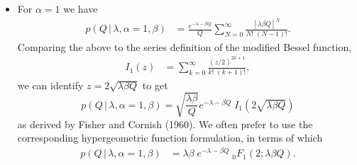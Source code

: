 \documentclass[11pt]{article}
\newcommand{\cond}{\,|\,}
\begin{document}
\begin{itemize}
\item For $\alpha=1$ we have
  \begin{align}
    p(Q\cond \lambda,\alpha{=}1,\beta)
    &= \frac{e^{-\lambda - \beta Q}}{Q}
      \sum_{N=0}^\infty
      \frac{[\lambda \beta Q]^N}{N!\;(N-1)!}.
  \end{align}
  Comparing the above to the series definition of the modified Bessel function,
  \begin{align}
    I_1(z) &= \sum_{k=0}^\infty \frac{(z/2)^{2k+1}}{k!\;(k+1)!},
  \end{align}
  we can identify $z = 2\sqrt{\lambda\beta Q}$ to get
  \begin{equation}
    \boxed{
      p(Q\cond \lambda,\alpha{=}1,\beta)
      = \sqrt{\frac{\lambda\beta}{Q}}  e^{-\lambda - \beta Q}
      \;I_1\!\left(2\sqrt{\lambda\beta Q}\right)
      }
  \end{equation}
  as derived by Fisher and Cornish (1960). We often prefer to use the
  corresponding hypergeometric function formulation, in terms of which
  \begin{align}
    p(Q\cond \lambda,\alpha{=}1,\beta)
    &= \lambda\beta\; e^{-\lambda - \beta Q}
      \;{}_0F_1(2; \lambda\beta Q).
  \end{align}


\end{itemize}
\end{document}
